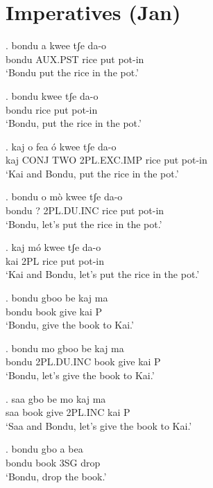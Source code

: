 \documentclass{assets/fieldnotes}
\begin{document}
{\section{Imperatives (Jan)} 


\exg. bondu a kwee tʃe da-o \\
bondu AUX.PST rice put pot-in \\
`Bondu put the rice in the pot.'

\exg. bondu kwee tʃe da-o \\
bondu rice put pot-in \\
`Bondu, put the rice in the pot.'

\exg. kaj o fea ó kwee tʃe da-o \\
kaj CONJ TWO 2PL.EXC.IMP rice put pot-in \\
`Kai and Bondu, put the rice in the pot.'


\exg. bondu o mò kwee tʃe da-o \\
bondu ? 2PL.DU.INC rice put pot-in \\
`Bondu, let's put the rice in the pot.'

\exg. kaj mó kwee tʃe da-o \\
kai 2PL rice put pot-in \\
`Kai and Bondu, let's put the rice in the pot.'


\exg. bondu gboo be kaj ma \\
bondu book give kai P \\
`Bondu, give the book to Kai.'

\exg. bondu mo gboo be kaj ma \\
bondu 2PL.DU.INC book give kai P \\
`Bondu, let's give the book to Kai.'

\exg. saa gbo be mo kaj ma \\
saa book give 2PL.INC kai P \\
`Saa and Bondu, let's give the book to Kai.'


 

\exg. bondu gbo a bea \\
bondu book 3SG drop \\
`Bondu, drop the book.'

}
\end{document}
